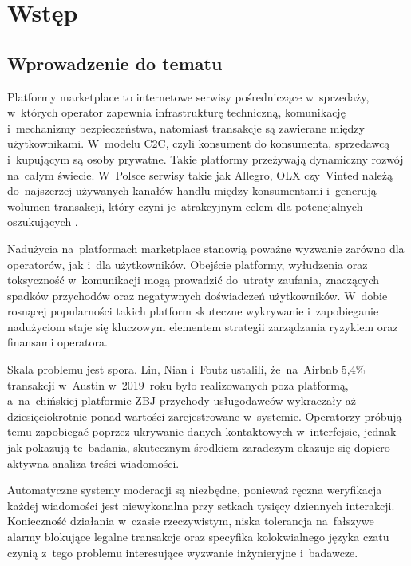 ﻿%
\chapter{Wstęp}
\label{ch:wstep}


\section{Wprowadzenie do tematu}

Platformy marketplace to internetowe serwisy pośredniczące w~sprzedaży,
w~których operator zapewnia infrastrukturę techniczną, komunikację i~mechanizmy
bezpieczeństwa, natomiast transakcje są zawierane między użytkownikami.
W~modelu C2C, czyli konsument do konsumenta, sprzedawcą i~kupującym są osoby
prywatne. Takie platformy przeżywają dynamiczny rozwój na~całym świecie.
W~Polsce serwisy takie jak Allegro, OLX czy~Vinted należą do~najszerzej
używanych kanałów handlu między konsumentami i~generują wolumen transakcji,
który czyni je~atrakcyjnym celem dla potencjalnych oszukujących \cite{bib:mayayise2024}.

Nadużycia na~platformach marketplace stanowią poważne wyzwanie zarówno dla
operatorów, jak i~dla użytkowników. Obejście platformy, wyłudzenia oraz toksyczność
w~komunikacji mogą prowadzić do~utraty zaufania, znaczących spadków przychodów
oraz negatywnych doświadczeń użytkowników. W~dobie rosnącej popularności takich
platform skuteczne wykrywanie i~zapobieganie nadużyciom staje się kluczowym
elementem strategii zarządzania ryzykiem oraz finansami operatora.

Skala problemu jest spora. Lin, Nian i~Foutz \cite{bib:lin2022airbnb} ustalili,
że~na~Airbnb 5,4\% transakcji w~Austin w~2019~roku było realizowanych poza platformą,
a~na~chińskiej platformie ZBJ przychody usługodawców wykraczały aż dziesięciokrotnie
ponad wartości zarejestrowane w~systemie. Operatorzy próbują temu zapobiegać
poprzez ukrywanie danych kontaktowych w~interfejsie, jednak jak pokazują te~badania,
skutecznym środkiem zaradczym okazuje się dopiero aktywna analiza treści wiadomości.

Automatyczne systemy moderacji są niezbędne, ponieważ ręczna weryfikacja każdej
wiadomości jest niewykonalna przy setkach tysięcy dziennych interakcji. Konieczność
działania w~czasie rzeczywistym, niska tolerancja na~fałszywe alarmy blokujące
legalne transakcje oraz specyfika kolokwialnego języka czatu czynią z~tego
problemu interesujące wyzwanie inżynieryjne i~badawcze.

